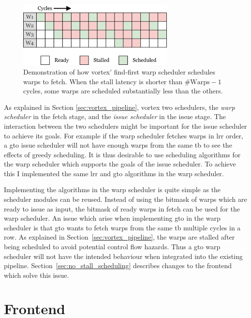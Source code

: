 \begin{figure}
    \centering
    \includegraphics[width=0.7\textwidth]{figures/find-first-scheduling.png}
    \caption[Demonstration of \Gls{vortex}' find-first warp scheduler.]{Demonstration of how \Gls{vortex}' find-first warp scheduler schedules warps to fetch. When the stall latency is shorter than $\text{\#Warps} - 1$ cycles, some warps are scheduled substantially less than the others.}
    \label{fig:find_first_scheduling}
\end{figure}

As explained in Section \ref{sec:vortex_pipeline}, \Gls{vortex} two schedulers, the \textit{warp scheduler} in the fetch stage, and the \textit{issue scheduler} in the issue stage. The interaction between the two schedulers might be important for the issue scheduler to achieve its goals. For example if the warp scheduler fetches warps in \acrshort{lrr} order, a \acrshort{gto} issue scheduler will not have enough warps from the same \acrshort{tb} to see the effects of greedy scheduling. It is thus desirable to use scheduling algorithms for the warp scheduler which supports the goals of the issue scheduler. To achieve this I implemented the same \acrshort{lrr} and \acrshort{gto} algorithms in the warp scheduler.

Implementing the algorithms in the warp scheduler is quite simple as the scheduler modules can be reused. Instead of using the bitmask of warps which are ready to issue as input, the bitmask of ready warps in fetch can be used for the warp scheduler. An issue which arise when implementing \acrshort{gto} in the warp scheduler is that \acrshort{gto} wants to fetch warps from the same \acrshort{tb} multiple cycles in a row. As explained in Section~\ref{sec:vortex_pipeline}, the warps are stalled after being scheduled to avoid potential control flow hazards. Thus a \acrshort{gto} warp scheduler will not have the intended behaviour when integrated into the existing pipeline. Section~\ref{sec:no_stall_scheduling} describes changes to the frontend which solve this issue.

\section{Frontend}

